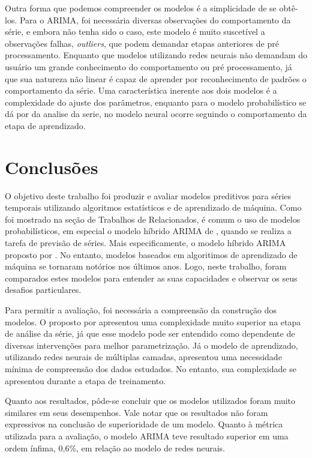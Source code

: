 \documentclass[
    12pt,
    oneside,
    a4paper,
    english,
    brazil
]{abntex2}
\begin{document}
Outra  forma  que  podemos  compreender  os modelos  é  a  simplicidade  de  se
obtê-los. Para o ARIMA, foi necessária diversas observações do comportamento da
série,  e embora  não tenha  sido  o caso,  este  modelo é  muito suscetível  a
observações falhas, \textit{outliers}, que  podem demandar etapas anteriores de
pré processamento. Enquanto  que modelos utilizando redes  neurais não demandam
do usuário um grande conhecimento do comportamento ou pré processamento, já que
sua natureza  não linear é  capaz de aprender  por reconhecimento de  padrões o
comportamento  da série.  Uma  característica  inerente aos  dois  modelos é  a
complexidade do ajuste dos parâmetros, enquanto para o modelo probabilístico se
dá por da analise da serie, no modelo neural ocorre seguindo o comportamento da
etapa de aprendizado.

\chapter{Conclusões}\label{chap:concl}

O objetivo deste trabalho foi produzir e avaliar modelos preditivos para séries
temporais utilizando algoritmos estatísticos e  de aprendizado de máquina. Como
foi mostrado na  seção de Trabalhos de  Relacionados, é comum o  uso de modelos
probabilísticos, em especial o modelo híbrido ARIMA de , quando
se  realiza a  tarefa de  previsão de  séries. Mais  especificamente, o  modelo
híbrido ARIMA  proposto por .  No entanto, modelos  baseados em
algoritimos de  aprendizado de máquina  se tornaram notórios nos  últimos anos.
Logo,  neste trabalho,  foram comparados  estes modelos  para entender  as suas
capacidades e observar os seus desafios particulares.

Para  permitir a  avaliação, foi  necessária  a compreensão  da construção  dos
modelos.  O proposto  por   apresentou  uma complexidade  muito
superior na etapa  de análise da série,  já que esse modelo  pode ser entendido
como  dependente  de  diversas  intervenções  para  melhor  parametrização.  Já
o  modelo  de  aprendizado,  utilizando redes  neurais  de  múltiplas  camadas,
apresentou  uma  necessidade mínima  de  compreensão  dos dados  estudados.  No
entanto, sua complexidade se apresentou durante a etapa de treinamento.

Quanto aos resultados,  pôde-se concluir que os modelos  utilizados foram muito
similares  em  seus  desempenhos.  Vale  notar  que  os  resultados  não  foram
expressivos  na conclusão  de  superioridade  de um  modelo.  Quanto à  métrica
utilizada para a avaliação, o modelo ARIMA teve resultado superior em uma ordem
ínfima, 0,6\%, em relação ao modelo de redes neurais.
\end{document}
